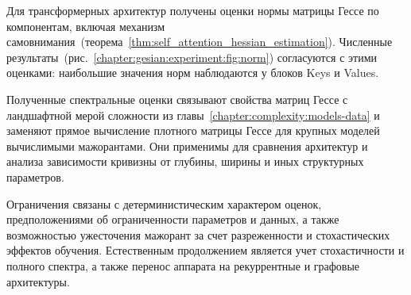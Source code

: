 Для трансформерных архитектур получены оценки нормы матрицы Гессе по компонентам, включая механизм самовнимания~(теорема~\ref{thm:self_attention_hessian_estimation}).
Численные результаты~(рис.~\ref{chapter:gesian:experiment:fig:norm}) согласуются с этими оценками: наибольшие значения норм наблюдаются у блоков Keys и Values.

Полученные спектральные оценки связывают свойства матриц Гессе с ландшафтной мерой сложности из главы~\ref{chapter:complexity:models-data} и заменяют прямое вычисление плотного матрицы Гессе для крупных моделей вычислимыми мажорантами.
Они применимы для сравнения архитектур и анализа зависимости кривизны от глубины, ширины и иных структурных параметров.

Ограничения связаны с детерминистическим характером оценок, предположениями об ограниченности параметров и данных, а также возможностью ужесточения мажорант за счет разреженности и стохастических эффектов обучения.
Естественным продолжением является учет стохастичности и полного спектра, а также перенос аппарата на рекуррентные и графовые архитектуры.